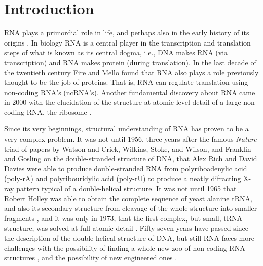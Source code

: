 \chapter{Introduction}
\label{introduction} 

RNA plays  a primordial role  in life, and  perhaps also in  the early
history   of  its   origins  \cite{woese1967,   crick1968,  orgel1968,
  orgel2004}. In biology RNA is  a central player in the transcription
and translation steps of what is known as its central dogma, i.e., DNA
makes  RNA   (via  transcription)   and  RNA  makes   protein  (during
translation).
In  the  last   decade  of  the  twentieth  century   Fire  and  Mello
\cite{fire1998} found that RNA also plays a role previously thought to
be the  job of proteins. That  is, RNA can  regulate translation using
non-coding RNA's  (ncRNA's).  Another fundamental  discovery about RNA
came in  2000 with  the elucidation of  the structure at  atomic level
detail of  a large non-coding RNA,  the ribosome \cite{schluenzen2000,
  ban2000, wimberly2000}.

Since its very beginnings,  structural understanding of RNA has proven
to be a very complex problem. It was not until 1956, three years after
the  famous  \textit{Nature} triad  of  papers  by  Watson and  Crick,
Wilkins,    Stoke,   and    Wilson,   and    Franklin    and   Gosling
\cite{watson1953a,  wilkins1953, franklin1953} on  the double-stranded
structure of DNA, that Alex Rich and David Davies were able to produce
double-stranded   RNA  from   polyriboadenylic   acid  (poly-rA)   and
polyribouridylic acid  (poly-rU) to produce a  neatly difracting X-ray
pattern typical of  a double-helical structure. It was  not until 1965
that Robert Holley  was able to obtain the  complete sequence of yeast
alanine tRNA,  and also its  secondary structure from cleavage  of the
whole structure  into smaller fragments \cite{holley1965},  and it was
only in 1973,  that the first complex, but  small, tRNA structure, was
solved at full  atomic detail \cite{robertus1974, kim1974, stout1976}.
Fifty  seven   years  have  passed   since  the  description   of  the
double-helical structure  of DNA, but still RNA  faces more challenges
with  the possibility of  finding a  whole new  zoo of  non-coding RNA
structures \cite{weinberg2009}, and  the possibility of new engineered
ones \cite{severcan2009}.


